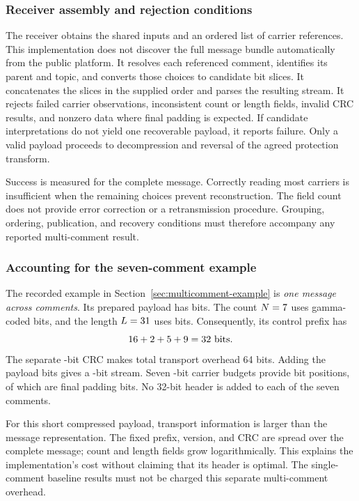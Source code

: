 \subsubsection{Receiver assembly and rejection conditions}
The receiver obtains the shared inputs and an ordered list of carrier references. This implementation does not discover the full message bundle automatically from the public platform. It resolves each referenced comment, identifies its parent and topic, and converts those choices to candidate bit slices. It concatenates the slices in the supplied order and parses the resulting stream. It rejects failed carrier observations, inconsistent count or length fields, invalid CRC results, and nonzero data where final padding is expected. If candidate interpretations do not yield one recoverable payload, it reports failure. Only a valid payload proceeds to decompression and reversal of the agreed protection transform.

Success is measured for the complete message. Correctly reading most carriers is insufficient when the remaining choices prevent reconstruction. The field count does not provide error correction or a retransmission procedure. Grouping, ordering, publication, and recovery conditions must therefore accompany any reported multi-comment result.

\subsubsection{Accounting for the seven-comment example}
The recorded example in Section~\ref{sec:multicomment-example} is \emph{one message across \McCount{} comments}. Its prepared payload has \McCompressedBits{} bits. The count $N=7$ uses \McCountBits{} gamma-coded bits, and the length $L=31$ uses \McLengthBits{} bits. Consequently, its control prefix has
\[
16+2+5+9=32\text{ bits}.
\]
The separate \McIntegrityBits{}-bit CRC makes total transport overhead 64 bits. Adding the \McCompressedBits{} payload bits gives a \McStreamBits{}-bit stream. Seven \McFrameBits{}-bit carrier budgets provide \McSlotBits{} bit positions, of which \McPaddingBits{} are final padding bits. No 32-bit header is added to each of the seven comments.

For this short compressed payload, transport information is larger than the message representation. The fixed prefix, version, and CRC are spread over the complete message; count and length fields grow logarithmically. This explains the implementation's cost without claiming that its header is optimal. The single-comment baseline results must not be charged this separate multi-comment overhead.
